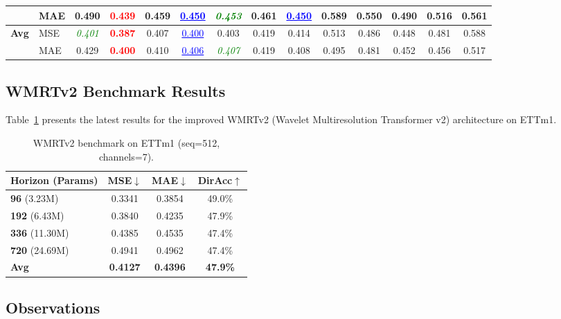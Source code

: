 \documentclass[11pt, letterpaper]{article}
\begin{document}
\begin{table}[H]
{\begin{tabular}{@{}llcccccccccccc@{}}
  & MAE & 0.490 & \textcolor{red}{\textbf{0.439}} & 0.459 & \textcolor{blue}{\underline{0.450}} & \textcolor{green}{\textit{0.453}} & 0.461 & \textcolor{blue}{\underline{0.450}} & 0.589 & 0.550 & 0.490 & 0.516 & 0.561 \\
\midrule
\multirow{2}{*}{\textbf{Avg}}
  & MSE & \textcolor{green}{\textit{0.401}} & \textcolor{red}{\textbf{0.387}} & 0.407 & \textcolor{blue}{\underline{0.400}} & 0.403 & 0.419 & 0.414 & 0.513 & 0.486 & 0.448 & 0.481 & 0.588 \\
  & MAE & 0.429 & \textcolor{red}{\textbf{0.400}} & 0.410 & \textcolor{blue}{\underline{0.406}} & \textcolor{green}{\textit{0.407}} & 0.419 & 0.408 & 0.495 & 0.481 & 0.452 & 0.456 & 0.517 \\
\bottomrule
\end{tabular}
}
\end{table}

\subsection{WMRTv2 Benchmark Results}

Table~\ref{tab:wmrtv2_results} presents the latest results for the improved WMRTv2 (Wavelet Multiresolution Transformer v2) architecture on ETTm1.

\begin{table}[H]
\centering
\caption{WMRTv2 benchmark on ETTm1 (seq=512, channels=7).}
\label{tab:wmrtv2_results}
\renewcommand{\arraystretch}{1.3}
\sffamily
\begin{tabular}{@{}lccc@{}}
\toprule
\textbf{Horizon (Params)} & \textbf{MSE}$\downarrow$ & \textbf{MAE}$\downarrow$ & \textbf{DirAcc}$\uparrow$ \\
\midrule
\textbf{96} (3.23M) & 0.3341 & 0.3854 & 49.0\% \\
\textbf{192} (6.43M) & 0.3840 & 0.4235 & 47.9\% \\
\textbf{336} (11.30M) & 0.4385 & 0.4535 & 47.4\% \\
\textbf{720} (24.69M) & 0.4941 & 0.4962 & 47.4\% \\
\midrule
\textbf{Avg} & \textbf{0.4127} & \textbf{0.4396} & \textbf{47.9\%} \\
\bottomrule
\end{tabular}
\end{table}

\subsection{Observations}
\end{document}
